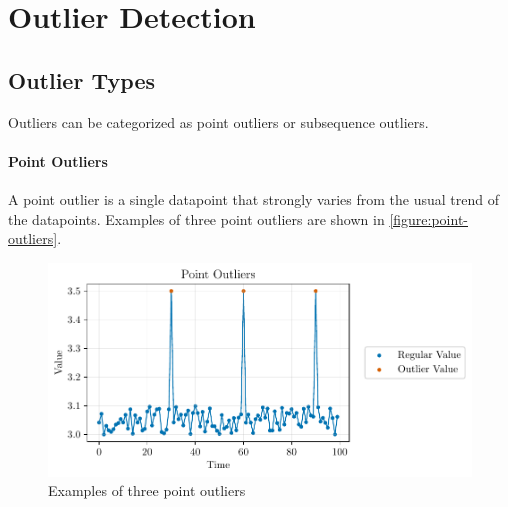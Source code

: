 \chapter{Outlier Detection}\label{chapter:outlier-detection}
\section{Outlier Types}\label{section:outlier-detection}
Outliers can be categorized as point outliers or subsequence outliers.
\subsubsection{Point Outliers}
A point outlier is a single datapoint that strongly varies from the usual trend of the datapoints. \cite{blazquez-garciaReviewOutlierAnomaly2020} Examples of three point outliers are shown in \autoref{figure:point-outliers}.
\begin{figure}[h]
  \centering
  \includegraphics{./plots/pdfs/point_outliers.pdf}
  \caption{Examples of three point outliers}
  \label{figure:point-outliers}
\end{figure}

